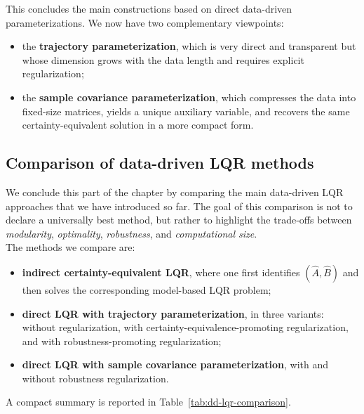 This concludes the main constructions based on direct data-driven parameterizations. We now
have two complementary viewpoints:
\begin{itemize}
    \item the \textbf{trajectory parameterization}, which is very direct and transparent but whose
    dimension grows with the data length and requires explicit regularization;
    \item the \textbf{sample covariance parameterization}, which compresses the data into fixed-size
    matrices, yields a unique auxiliary variable, and recovers the same certainty-equivalent
    solution in a more compact form.
\end{itemize}


\subsection{Comparison of data-driven LQR methods}

We conclude this part of the chapter by comparing the main data-driven LQR approaches that we
have introduced so far. The goal of this comparison is not to declare a universally best method,
but rather to highlight the trade-offs between \emph{modularity}, \emph{optimality},
\emph{robustness}, and \emph{computational size}.\\
The methods we compare are:
\begin{itemize}
    \item \textbf{indirect certainty-equivalent LQR}, where one first identifies $(\hat A,\hat B)$ and then
    solves the corresponding model-based LQR problem;
    \item \textbf{direct LQR with trajectory parameterization}, in three variants:
    without regularization, with certainty-equivalence-promoting regularization, and with
    robustness-promoting regularization;
    \item \textbf{direct LQR with sample covariance parameterization}, with and without robustness
    regularization.
\end{itemize}
A compact summary is reported in Table~\ref{tab:dd-lqr-comparison}.

